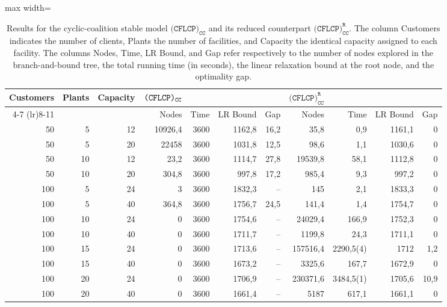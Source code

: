 \documentclass[preprint,11pt,authoryear]{elsarticle}
\begin{document}
\begin{table}%
\centering
\begin{adjustbox}{max width=\textwidth}
\begin{tabular}{rrr  rrrr rrrr}
\toprule
Customers & Plants & Capacity & ${\normalfont\texttt{(CFLCP)}_{\texttt{CC}}}$ & & & & $\texttt{(CFLCP)}_{\texttt{CC}}^\texttt{R}$ & & & \\
\cmidrule(lr){4-7} \cmidrule(lr){8-11}
& & & Nodes & Time & LR Bound & Gap & Nodes & Time & LR Bound & Gap \\
\midrule
50&5&12&10926,4&3600&1162,8&16,2&35,8&0,9&1161,1&0 \\
50&5&20&22458&3600&1031,8&12,5&98,6&1,1&1030,6&0 \\[2mm]
50&10&12&23,2&3600&1114,7&27,8&19539,8&58,1&1112,8&0 \\
50&10&20&304,8&3600&997,8&17,2&985,4&9,3&997,2&0 \\[2mm]
100&5&24&3&3600&1832,3&--&145&2,1&1833,3&0 \\
100&5&40&364,8&3600&1756,7&24,5&141,4&1,4&1754,7&0 \\[2mm]
100&10&24&0&3600&1754,6&--&24029,4&166,9&1752,3&0 \\
100&10&40&0&3600&1711,7&--&1199,8&24,3&1711,1&0 \\[2mm]
100&15&24&0&3600&1713,6&--&157516,4&2290,5(4)&1712&1,2 \\
100&15&40&0&3600&1673,2&--&3325,6&167,7&1672,9&0 \\[2mm]
100&20&24&0&3600&1706,9&--&230371,6&3484,5(1)&1705,6&10,9 \\
100&20&40&0&3600&1661,4&--&5187&617,1&1661,1&0 \\
\bottomrule
\end{tabular}
\end{adjustbox}
\caption{Results for the cyclic-coalition stable model \(\texttt{(CFLCP)}_{\texttt{CC}}\) and its reduced counterpart \(\texttt{(CFLCP)}_{\texttt{CC}}^\texttt{R}\). The column Customers indicates the number of clients, Plants the number of facilities, and Capacity the identical capacity assigned to each facility. The columns Nodes, Time, LR Bound, and Gap refer respectively to the number of nodes explored in the branch-and-bound tree, the total running time (in seconds), the linear relaxation bound at the root node, and the optimality gap.}
\label{tab:cycliccoalition-results}
\end{table}
\end{document}
